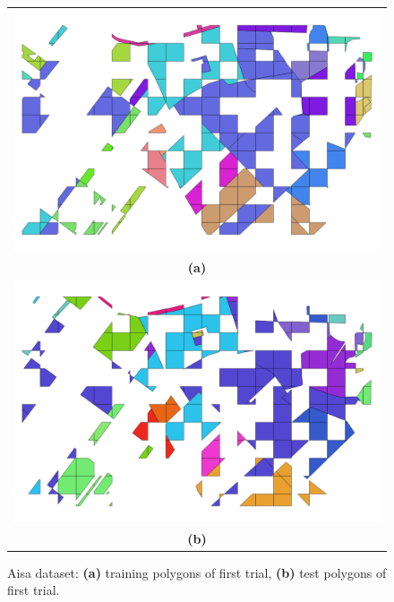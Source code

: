 \documentclass[journal,peerreview,onecolumn]{IEEEtran}
\begin{document}
    \begin{figure}[!t]
        \centering
        \begin{tabular}{c}
            \includegraphics[width=0.7\columnwidth]{Fig/aisa_gt_train.png} \\
            {\bfseries{(a)}} \\
            \includegraphics[width=0.7\columnwidth]{Fig/aisa_gt_test.png} \\
            {\bfseries{(b)}} \\
        \end{tabular}
        \caption{Aisa dataset: {\bfseries{(a)}} training polygons of first trial, {\bfseries{(b)}} test polygons of first trial.\label{fig:set-aisa}}
    \end{figure}
\end{document}
